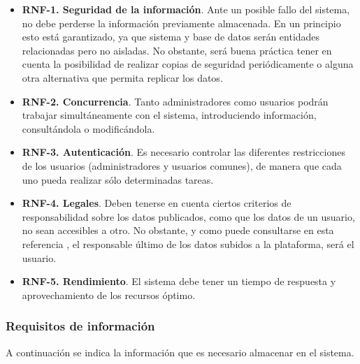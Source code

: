 \begin{itemize}

	\item \textbf{RNF-1. Seguridad de la información}. Ante un posible fallo del sistema, no debe perderse la información previamente almacenada. En un principio esto está garantizado, ya que sistema y base de datos serán entidades relacionadas pero no aisladas. No obstante, será buena práctica tener en cuenta la posibilidad de realizar copias de seguridad periódicamente o alguna otra alternativa que permita replicar los datos.

	\item \textbf{RNF-2. Concurrencia}. Tanto administradores como usuarios podrán trabajar simultáneamente con el sistema,
introduciendo información, consultándola o modificándola.

	\item \textbf{RNF-3. Autenticación}. Es necesario controlar las diferentes restricciones de los usuarios (administradores y usuarios comunes), de manera que cada uno pueda realizar sólo determinadas tareas.

	\item \textbf{RNF-4. Legales}. Deben tenerse en cuenta ciertos criterios de responsabilidad sobre los datos publicados, como que los datos de un usuario, no sean accesibles a otro. No obstante, y como puede consultarse en esta referencia \cite{GMELNEL}, el responsable último de los datos subidos a la plataforma, será el usuario.
	
	\item \textbf{RNF-5. Rendimiento}. El sistema debe tener un tiempo de respuesta y aprovechamiento de los recursos
óptimo.

\end{itemize}

\subsubsection{Requisitos de información}
A continuación se indica la información que es necesario almacenar en el sistema.

